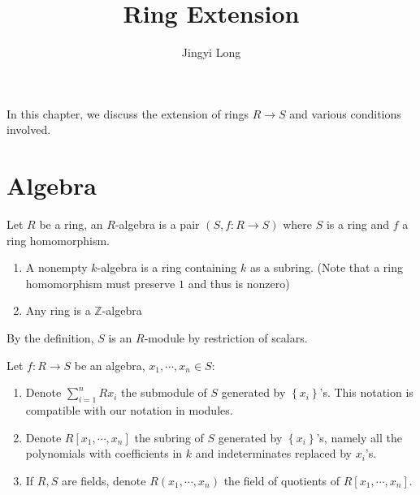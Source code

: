 \documentclass{note-eng}
\title{Ring Extension}
\author{Jingyi Long}
\begin{document}
\maketitle
\tableofcontents

In this chapter, we discuss the extension of rings $R \rightarrow S$ and various conditions involved.

\newpage

\section{Algebra}

\begin{definition}[Algebra]
    Let $R$ be a ring, an $R$-algebra is a pair $(S, f: R \rightarrow S)$ where $S$ is a ring and $f$ a ring homomorphism.
\end{definition}

\begin{remark}
    \begin{enumerate}
        \item A nonempty $k$-algebra is a ring containing $k$ as a subring. (Note that a ring homomorphism must preserve $1$ and thus is nonzero)
        \item Any ring is a $\mathbb{Z}$-algebra
    \end{enumerate}
\end{remark}

By the definition, $S$ is an $R$-module by restriction of scalars.

\begin{notation}
    Let $f: R \rightarrow S$ be an algebra, $x_1, \cdots, x_n \in S$:
    \begin{enumerate}
        \item Denote $\sum\limits_{i = 1}^{n} Rx_i$ the submodule of $S$ generated by $\left\lbrace x_i \right\rbrace$'s. This notation is compatible with our notation in modules.
        \item Denote $R[x_1, \cdots, x_n]$ the subring of $S$ generated by $\left\lbrace x_i \right\rbrace$'s, namely all the polynomials with coefficients in $k$ and indeterminates replaced by $x_i$'s.
        \item If $R, S$ are fields, denote $R(x_1, \cdots, x_n)$ the field of quotients of $R[x_1, \cdots, x_n]$.
    \end{enumerate}
\end{notation}
\end{document}
